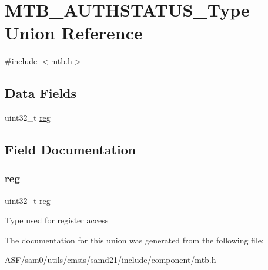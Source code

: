 \hypertarget{union_m_t_b___a_u_t_h_s_t_a_t_u_s___type}{}\section{M\+T\+B\+\_\+\+A\+U\+T\+H\+S\+T\+A\+T\+U\+S\+\_\+\+Type Union Reference}
\label{union_m_t_b___a_u_t_h_s_t_a_t_u_s___type}


{\ttfamily \#include $<$mtb.\+h$>$}

\subsection*{Data Fields}
\begin{DoxyCompactItemize}
\item 
uint32\+\_\+t \mbox{\hyperlink{union_m_t_b___a_u_t_h_s_t_a_t_u_s___type_a6b91636401516a477989a336376d7b40}{reg}}
\end{DoxyCompactItemize}


\subsection{Field Documentation}
\mbox{\label{union_m_t_b___a_u_t_h_s_t_a_t_u_s___type_a6b91636401516a477989a336376d7b40}} 
\subsubsection{\texorpdfstring{reg}{reg}}
{\footnotesize\ttfamily uint32\+\_\+t reg}

Type used for register access 

The documentation for this union was generated from the following file\+:\begin{DoxyCompactItemize}
\item 
A\+S\+F/sam0/utils/cmsis/samd21/include/component/\mbox{\hyperlink{component_2mtb_8h}{mtb.\+h}}\end{DoxyCompactItemize}

